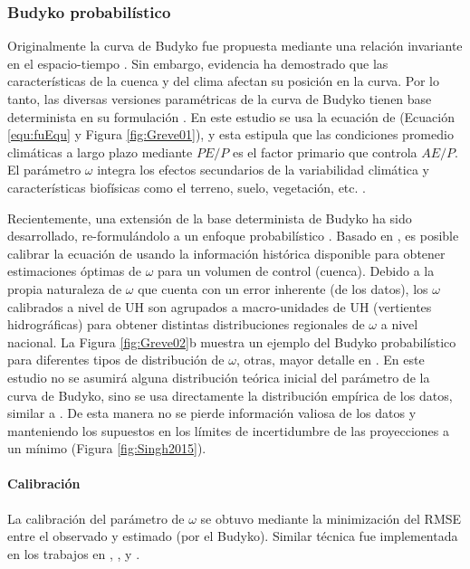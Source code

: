 \documentclass[12pt]{article}
\begin{document}
\subsubsection{Budyko probabilístico}

Originalmente la curva de Budyko fue propuesta mediante una relación invariante en el espacio-tiempo \citep{Budyko1961,Pike1964}. Sin embargo, evidencia ha demostrado que las características de la cuenca y del clima afectan su posición en la curva. Por lo tanto, las diversas versiones paramétricas de la curva de Budyko tienen base determinista en su formulación \citep{Fu1981,Zhang2004,Zhang2008,Wang2014}. En este estudio se usa la ecuación de \citep{Fu1981} (Ecuación \ref{equ:fuEqu} y Figura \ref{fig:Greve01}), y esta estipula que las condiciones promedio climáticas a largo plazo mediante $PE/P$ es el factor primario que controla $AE/P$. El parámetro $\omega$ integra los efectos secundarios de la variabilidad climática y características biofísicas como el terreno, suelo, vegetación, etc. \citep{Gentine2012,Berghuijs2014,Greve2015}.

Recientemente, una extensión de la base determinista de Budyko ha sido desarrollado, re-formulándolo a un enfoque probabilístico \citep{Greve2015}. Basado en \citet{Greve2015}, es posible calibrar la ecuación de \cite{Fu1981} usando la información histórica disponible para obtener estimaciones óptimas de $\omega$ para un volumen de control (cuenca). Debido a la propia naturaleza de $\omega$ que cuenta con un error inherente (de los datos), los $\omega$ calibrados a nivel de UH son agrupados a macro-unidades de UH (vertientes hidrográficas) para obtener distintas distribuciones regionales de $\omega$ a nivel nacional. La Figura \ref{fig:Greve02}b muestra un ejemplo del Budyko probabilístico para diferentes tipos de distribución de $\omega$, otras, mayor detalle en \citet{Greve2015}. En este estudio no se asumirá alguna distribución teórica inicial del parámetro de la curva de Budyko, sino se usa directamente la distribución empírica de los datos, similar a \citet{Singh2015}. De esta manera no se pierde información valiosa de los datos y manteniendo los supuestos en los límites de incertidumbre de las proyecciones a un mínimo (Figura \ref{fig:Singh2015}).

\paragraph{Calibración}\mbox{}

La calibración del parámetro de $\omega$ se obtuvo mediante la minimización del RMSE entre el observado y estimado (por el Budyko). Similar técnica fue implementada en los trabajos en \citet{Zhang2004}, \citet{xiong2012appraisal}, y \citet{Singh2015}.
\end{document}
